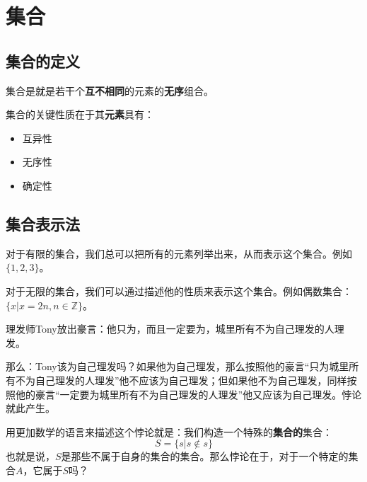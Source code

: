 \section{集合}

\subsection{集合的定义}

\begin{definition}[集合]
    集合是就是若干个\textbf{互不相同}的元素的\textbf{无序}组合。
\end{definition}

集合的关键性质在于其\textbf{元素}具有：

\begin{itemize}
    \item 互异性
    \item 无序性
    \item 确定性
\end{itemize}

\subsection{集合表示法}

\begin{definition}[列举法]
    对于有限的集合，我们总可以把所有的元素列举出来，从而表示这个集合。例如$\{1,2,3\}$。
\end{definition}

\begin{definition}[描述法]
    对于无限的集合，我们可以通过描述他的性质来表示这个集合。例如偶数集合：$\{x|x=2n,n\in\mathbb{Z}\}$。
\end{definition}

\begin{exercise}

    理发师Tony放出豪言：他只为，而且一定要为，城里所有不为自己理发的人理发。

    那么：Tony该为自己理发吗？如果他为自己理发，那么按照他的豪言“只为城里所有不为自己理发的人理发”他不应该为自己理发；但如果他不为自己理发，同样按照他的豪言“一定要为城里所有不为自己理发的人理发”他又应该为自己理发。悖论就此产生。

    用更加数学的语言来描述这个悖论就是：我们构造一个特殊的\textbf{集合的}集合：
    $$
        S = \{s|s \notin s\}
    $$
    也就是说，$S$是那些不属于自身的集合的集合。那么悖论在于，对于一个特定的集合$A$，它属于$S$吗？
\end{exercise}

